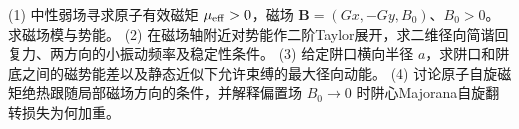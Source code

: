 (1) 中性弱场寻求原子有效磁矩 \(\mu_{\rm eff}>0\)，磁场 \(\mathbf B=(Gx,-Gy,B_0)\)、\(B_0>0\)。求磁场模与势能。
(2) 在磁场轴附近对势能作二阶Taylor展开，求二维径向简谐回复力、两方向的小振动频率及稳定性条件。
(3) 给定阱口横向半径 \(a\)，求阱口和阱底之间的磁势能差以及静态近似下允许束缚的最大径向动能。
(4) 讨论原子自旋磁矩绝热跟随局部磁场方向的条件，并解释偏置场 \(B_0\to0\) 时阱心Majorana自旋翻转损失为何加重。
